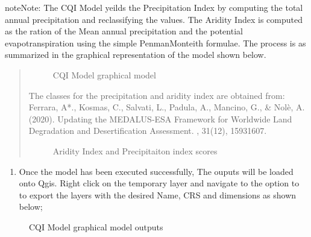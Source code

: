 \documentclass[letterpaper,10pt,english]{sphinxmanual}
\let\sphinxpxdimen\pdfpxdimen\else\newdimen\sphinxpxdimen
\begin{document}
\begin{sphinxadmonition}{note}{Note:}
\sphinxAtStartPar
The CQI Model yeilds the Precipitation Index by computing the total annual precipitation and reclassifying the values. The Aridity Index is computed as the ration of the Mean annual precipitation and the potential evapotranspiration using the simple Penman\sphinxhyphen{}Monteith formulae. The process is as summarized in the graphical representation of the model shown below.
\begin{quote}

\begin{figure}[H]
\centering
\capstart

\noindent\sphinxincludegraphics[width=800\sphinxpxdimen,height=300\sphinxpxdimen]{{cqi5}.png}
\caption{CQI Model graphical model}\label{\detokenize{Preprocessing/cqi:id7}}\end{figure}

\sphinxAtStartPar
The classes for the precipitation and aridity index are obtained from: Ferrara, A*., Kosmas, C., Salvati, L., Padula, A., Mancino, G., \& Nolè, A. (2020). Updating the MEDALUS‐ESA Framework for Worldwide Land Degradation and Desertification Assessment. , 31(12), 1593\sphinxhyphen{}1607.

\begin{figure}[H]
\centering
\capstart

\noindent\sphinxincludegraphics[width=544\sphinxpxdimen,height=208\sphinxpxdimen]{{cqi9}.png}
\caption{Aridity Index and Precipitaiton index scores}\label{\detokenize{Preprocessing/cqi:id8}}\end{figure}
\end{quote}
\end{sphinxadmonition}
\begin{enumerate}
%
\setcounter{enumi}{3}
\item {} 
\sphinxAtStartPar
Once the model has been executed successfully, The ouputs will be loaded onto Qgis. Right click on the temporary layer and navigate to the  option to to export the layers with the desired Name, CRS and dimensions as shown below;

\end{enumerate}

\begin{figure}[H]
\centering
\capstart

\noindent\sphinxincludegraphics[width=800\sphinxpxdimen,height=681\sphinxpxdimen]{{cqi6}.png}
\caption{CQI Model graphical model outputs}\label{\detokenize{Preprocessing/cqi:id9}}\end{figure}
\end{document}
